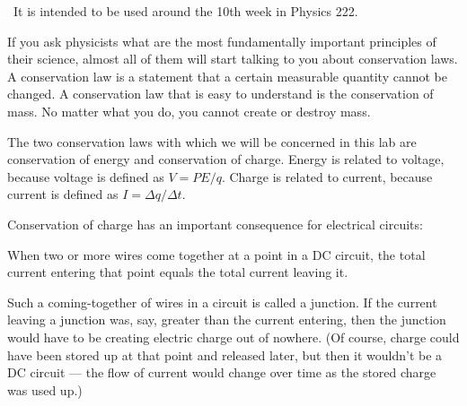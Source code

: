 \renewcommand\thechapter{c2.10a}
\label{lab:kirchoff}

\covid\ 
It is intended to be used around the 10th week in Physics 222.

\apparatus
{}
\equip{replacement fuses for multimeter}


\introduction

If you ask physicists what are the most fundamentally
important principles of their science, almost all of them
will start talking to you about conservation laws. A
conservation law is a statement that a certain measurable
quantity cannot be changed. A conservation law that is easy
to understand is the conservation of mass. No matter what
you do, you cannot create or destroy mass.

The two conservation laws with which we will be concerned in
this lab are conservation of energy and conservation of
charge. Energy is related to voltage, because voltage is
defined as $V=PE/q$. Charge is related to current, because
current is defined as $I=\Delta q/\Delta t$.

Conservation of charge has an important consequence for
electrical circuits:

When two or more wires come together at a point in a DC circuit,
the total current entering that point equals the total current
leaving it.

Such a coming-together of wires in a circuit is called a
junction. If the current leaving a junction was, say,
greater than the current entering, then the junction would
have to be creating electric charge out of nowhere. (Of
course, charge could have been stored up at that point and
released later, but then it wouldn't be a DC circuit --- the
flow of current would change over time as the stored
charge was used up.)

